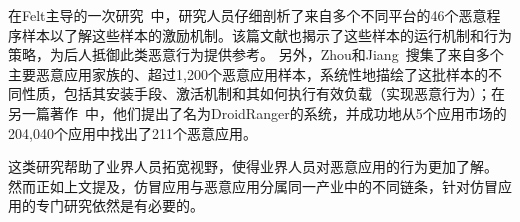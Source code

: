在Felt主导的一次研究~\cite{Felt2011ASO}中，研究人员仔细剖析了来自多个不同平台的46个恶意程序样本以了解这些样本的激励机制。该篇文献也揭示了这些样本的运行机制和行为策略，为后人抵御此类恶意行为提供参考。
另外，Zhou和Jiang~\cite{Zhou2012DissectingAM}搜集了来自多个主要恶意应用家族的、超过1,200个恶意应用样本，系统性地描绘了这批样本的不同性质，包括其安装手段、激活机制和其如何执行有效负载（实现恶意行为）；在另一篇著作~\cite{zhou2012hey}中，他们提出了名为DroidRanger的系统，并成功地从5个应用市场的204,040个应用中找出了211个恶意应用。

这类研究帮助了业界人员拓宽视野，使得业界人员对恶意应用的行为更加了解。
然而正如上文提及，仿冒应用与恶意应用分属同一产业中的不同链条，针对仿冒应用的专门研究依然是有必要的。

